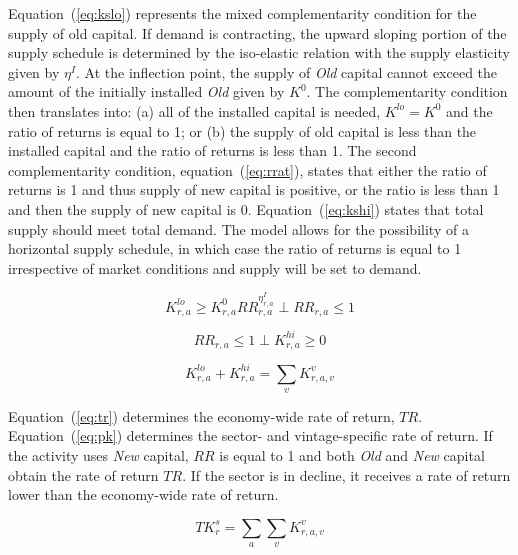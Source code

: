 \documentclass[11pt,letterpaper]{report}
\begin{document}
Equation~(\ref{eq:kslo}) represents the mixed complementarity
condition for the supply of old capital. If demand is contracting,
the upward sloping portion of the supply schedule is determined
by the iso-elastic relation with the supply elasticity given
by $\eta^I$. At the inflection point, the supply of \emph{Old}
capital cannot exceed the amount of the initially installed \emph{Old}
given by $K^0$. The complementarity condition then translates into:
(a) all of the installed capital is needed, $K^{\mathit{lo}}=K^0$ and the ratio
of returns is equal to 1; or (b) the supply of old capital
is less than the installed capital and the ratio of returns is
less than 1. The second complementarity condition, equation~(\ref{eq:rrat}),
states that either the ratio of returns is 1 and thus supply of new
capital is positive, or the ratio is less than 1 and then the supply of new
capital is 0. Equation~(\ref{eq:kshi}) states that total supply
should meet total demand. The model allows for the possibility
of a horizontal supply schedule, in which case the ratio of returns
is equal to 1 irrespective of market conditions and supply will be
set to demand.

\begin{equation}
\label{eq:kslo}
K^{\mathit{lo}}_{r,a} \ge \mathit{K}^0_{r,a} \mathit{RR}_{r,a}^{\eta^I_{r,a}}
\perp \mathit{RR}_{r,a} \le 1
\end{equation}

\begin{equation}
\label{eq:rrat}
\mathit{RR}_{r,a} \le 1
\perp K^{\mathit{hi}}_{r,a} \ge 0
\end{equation}

\begin{equation}
\label{eq:kshi}
K^{\mathit{lo}}_{r,a} + K^{\mathit{hi}}_{r,a} = \sum_v{K^v_{r,a,v}}
\end{equation}

Equation~(\ref{eq:tr}) determines the economy-wide rate of return,
$\mathit{TR}$. Equation~(\ref{eq:pk}) determines the sector- and
vintage-specific rate of return. If the activity uses \emph{New} capital,
$\mathit{RR}$ is equal to 1 and both \emph{Old} and \emph{New} capital obtain
the rate of return $\mathit{TR}$. If the sector is in decline, it receives a
rate of return lower than the economy-wide rate of return.

\begin{equation}
\label{eq:tr}
\mathit{TK}^s_r = \sum_a {\sum_v { K^v_{r,a,v}} }
\end{equation}
\end{document}
